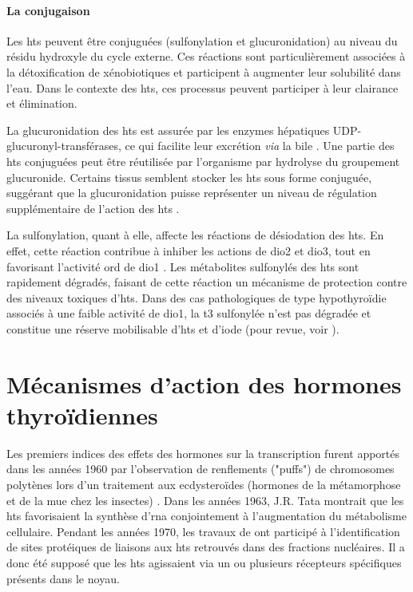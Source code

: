\documentclass[../main.tex]{subfiles}
\begin{document}
\paragraph{La conjugaison}
Les \glspl{ht} peuvent être conjuguées (sulfonylation et glucuronidation) au niveau du résidu hydroxyle du cycle externe.
Ces réactions sont particulièrement associées à la détoxification de xénobiotiques et participent à augmenter leur solubilité dans l'eau.
Dans le contexte des \glspl{ht}, ces processus peuvent participer à leur clairance et élimination.
\par
La glucuronidation des \glspl{ht} est assurée par les enzymes hépatiques UDP-glucuronyl-transférases, ce qui facilite leur excrétion \textit{via} la bile \citep{Visser1996}.
Une partie des \glspl{ht} conjuguées peut être réutilisée par l'organisme par hydrolyse du groupement glucuronide.
Certains tissus semblent stocker les \glspl{ht} sous forme conjuguée, suggérant que la glucuronidation puisse représenter un niveau de régulation supplémentaire de l'action des \glspl{ht} \citep{VanderHeide2007}.
\par
La sulfonylation, quant à elle, affecte les réactions de désiodation des \glspl{ht}.
En effet, cette réaction contribue à inhiber les actions de \gls{dio2} et \gls{dio3}, tout en favorisant l'activité \gls{ord} de \gls{dio1} \citep{Visser1990}.
Les métabolites sulfonylés des \glspl{ht} sont rapidement dégradés, faisant de cette réaction un mécanisme de protection contre des niveaux toxiques d'\glspl{ht}.
Dans des cas pathologiques de type hypothyroïdie associés à une faible activité de \gls{dio1}, la \gls{t3} sulfonylée n'est pas dégradée et constitue une réserve mobilisable d'\glspl{ht} et d'iode (pour revue, voir \citealp{Visser1994}).





\section{Mécanismes d'action des hormones thyroïdiennes}

Les premiers indices des effets des hormones sur la transcription furent apportés dans les années 1960 par l'observation de renflements ("puffs") de chromosomes polytènes lors d'un traitement aux ecdysteroïdes (hormones de la métamorphose et de la mue chez les insectes) \citep{Clever1960}.
Dans les années 1963, J.R. Tata montrait que les \glspl{ht} favorisaient la synthèse d'\gls{rna} conjointement à l'augmentation du métabolisme cellulaire.
Pendant les années 1970, les travaux de \citet{Samuels1973} ont participé à l'identification de sites protéiques de liaisons aux \glspl{ht} retrouvés dans des fractions nucléaires. Il a donc été supposé que les \glspl{ht} agissaient via un ou plusieurs récepteurs spécifiques présents dans le noyau.
\end{document}
